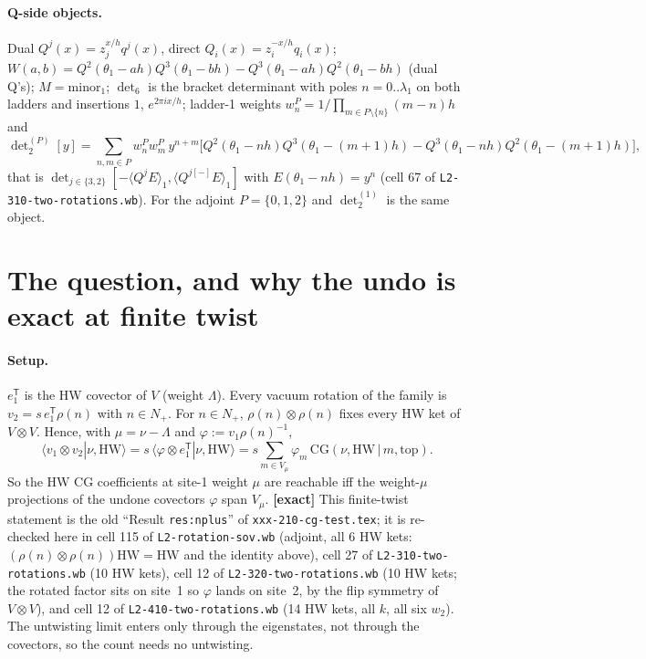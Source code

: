 \documentclass[11pt]{article}
\newcommand{\eT}{e_1^{\mathsf T}}
\newcommand{\ex}{\textbf{[exact]}}
\newcommand{\nb}[1]{\texttt{#1}}
\begin{document}
\paragraph{Q-side objects.} Dual $Q^j(x)=z_j^{x/h}q^j(x)$, direct $Q_i(x)=z_i^{-x/h}q_i(x)$; $W(a,b)=Q^2(\theta_1-ah)Q^3(\theta_1-bh)-Q^3(\theta_1-ah)Q^2(\theta_1-bh)$ (dual Q's); $M=\mathrm{minor}_1$; $\det_6$ is the bracket determinant with poles $n=0..\lambda_1$ on both ladders and insertions $1$, $e^{2\pi ix/h}$; ladder-1 weights $w_n^P=1/\prod_{m\in P\setminus\{n\}}(m-n)h$ and
\[
\det\nolimits_2^{(P)}[y]=\sum_{n,m\in P}w_n^Pw_m^P\,y^{n+m}\big[Q^2(\theta_1-nh)Q^3(\theta_1-(m+1)h)-Q^3(\theta_1-nh)Q^2(\theta_1-(m+1)h)\big],
\]
that is $\det_{j\in\{3,2\}}[-\langle Q^jE\rangle_1,\langle Q^{j[-]}E\rangle_1]$ with $E(\theta_1-nh)=y^n$ (cell 67 of \nb{L2-310-two-rotations.wb}). For the adjoint $P=\{0,1,2\}$ and $\det_2^{(1)}$ is the same object.

\section{The question, and why the undo is exact at finite twist}\label{sec:undo}

\paragraph{Setup.} $\eT$ is the HW covector of $V$ (weight $\Lambda$). Every vacuum rotation of the family is $v_2=s\,\eT\rho(n)$ with $n\in N_+$. For $n\in N_+$, $\rho(n)\otimes\rho(n)$ fixes every HW ket of $V\otimes V$. Hence, with $\mu=\nu-\Lambda$ and $\varphi:=v_1\rho(n)^{-1}$,
\[
\langle v_1\otimes v_2|\nu,\mathrm{HW}\rangle=s\,\langle\varphi\otimes\eT|\nu,\mathrm{HW}\rangle=s\sum_{m\in V_\mu}\varphi_m\,\mathrm{CG}(\nu,\mathrm{HW}\,|\,m,\mathrm{top}).
\]
So the HW CG coefficients at site-1 weight $\mu$ are reachable iff the weight-$\mu$ projections of the undone covectors $\varphi$ span $V_\mu$. \ex{} This finite-twist statement is the old ``Result \texttt{res:nplus}'' of \nb{xxx-210-cg-test.tex}; it is re-checked here in cell 115 of \nb{L2-rotation-sov.wb} (adjoint, all 6 HW kets: $(\rho(n)\otimes\rho(n))\mathrm{HW}=\mathrm{HW}$ and the identity above), cell 27 of \nb{L2-310-two-rotations.wb} (10 HW kets), cell 12 of \nb{L2-320-two-rotations.wb} (10 HW kets; the rotated factor sits on site~1 so $\varphi$ lands on site~2, by the flip symmetry of $V\otimes V$), and cell 12 of \nb{L2-410-two-rotations.wb} (14 HW kets, all $k$, all six $w_2$). The untwisting limit enters only through the eigenstates, not through the covectors, so the count needs no untwisting.
\end{document}
